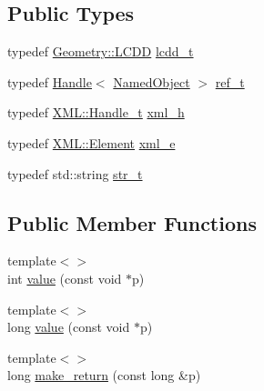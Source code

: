 \subsection*{Public Types}
\begin{DoxyCompactItemize}
\item 
typedef \hyperlink{class_d_d4hep_1_1_geometry_1_1_l_c_d_d}{Geometry\+::\+L\+C\+DD} \hyperlink{struct_d_d4hep_1_1_plugin_factory_base_a61b840cc18cdd24ae2e383da306b9c9a}{lcdd\+\_\+t}
\item 
typedef \hyperlink{class_d_d4hep_1_1_handle}{Handle}$<$ \hyperlink{class_d_d4hep_1_1_named_object}{Named\+Object} $>$ \hyperlink{struct_d_d4hep_1_1_plugin_factory_base_ab13458952a5b4a91f5130d3ee4db4d33}{ref\+\_\+t}
\item 
typedef \hyperlink{class_d_d4hep_1_1_x_m_l_1_1_handle__t}{X\+M\+L\+::\+Handle\+\_\+t} \hyperlink{struct_d_d4hep_1_1_plugin_factory_base_aedebe6835e2705756763812545bcb8fd}{xml\+\_\+h}
\item 
typedef \hyperlink{class_d_d4hep_1_1_x_m_l_1_1_element}{X\+M\+L\+::\+Element} \hyperlink{struct_d_d4hep_1_1_plugin_factory_base_a4fd06e29fc55de37e856b2a72831d50e}{xml\+\_\+e}
\item 
typedef std\+::string \hyperlink{struct_d_d4hep_1_1_plugin_factory_base_aaa4c6d8801f70db2776c5473abc92692}{str\+\_\+t}
\end{DoxyCompactItemize}
\subsection*{Public Member Functions}
\begin{DoxyCompactItemize}
\item 
{\footnotesize template$<$$>$ }\\int \hyperlink{struct_d_d4hep_1_1_plugin_factory_base_aad606ff4edce954df9c7c63bc77492db}{value} (const void $\ast$p)
\item 
{\footnotesize template$<$$>$ }\\long \hyperlink{struct_d_d4hep_1_1_plugin_factory_base_a5a57b4f1d4424f04dc565923fe43af3e}{value} (const void $\ast$p)
\item 
{\footnotesize template$<$$>$ }\\long \hyperlink{struct_d_d4hep_1_1_plugin_factory_base_af3452006a01f31b7226067fb00c27e13}{make\+\_\+return} (const long \&p)
\end{DoxyCompactItemize}
